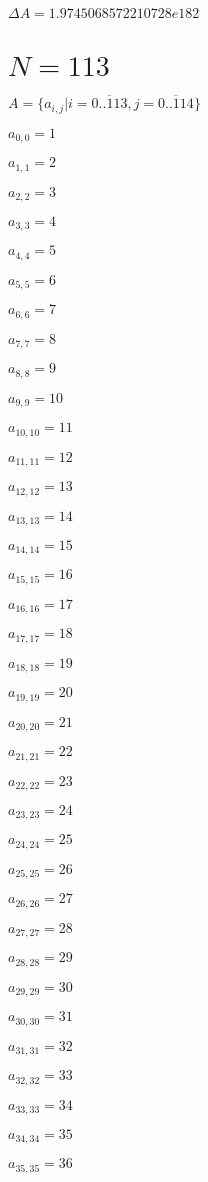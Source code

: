 \documentclass[a4paper,12pt]{article}
\begin{document}
$\Delta A = 1.9745068572210728e182$



\section{ $N = 113$ }
$A = \{ a _{ i, j } | i = \overline { 0..113 }, j = \overline { 0..114 } \}$

$a _{ 0, 0 } = 1$

$a _{ 1, 1 } = 2$

$a _{ 2, 2 } = 3$

$a _{ 3, 3 } = 4$

$a _{ 4, 4 } = 5$

$a _{ 5, 5 } = 6$

$a _{ 6, 6 } = 7$

$a _{ 7, 7 } = 8$

$a _{ 8, 8 } = 9$

$a _{ 9, 9 } = 10$

$a _{ 10, 10 } = 11$

$a _{ 11, 11 } = 12$

$a _{ 12, 12 } = 13$

$a _{ 13, 13 } = 14$

$a _{ 14, 14 } = 15$

$a _{ 15, 15 } = 16$

$a _{ 16, 16 } = 17$

$a _{ 17, 17 } = 18$

$a _{ 18, 18 } = 19$

$a _{ 19, 19 } = 20$

$a _{ 20, 20 } = 21$

$a _{ 21, 21 } = 22$

$a _{ 22, 22 } = 23$

$a _{ 23, 23 } = 24$

$a _{ 24, 24 } = 25$

$a _{ 25, 25 } = 26$

$a _{ 26, 26 } = 27$

$a _{ 27, 27 } = 28$

$a _{ 28, 28 } = 29$

$a _{ 29, 29 } = 30$

$a _{ 30, 30 } = 31$

$a _{ 31, 31 } = 32$

$a _{ 32, 32 } = 33$

$a _{ 33, 33 } = 34$

$a _{ 34, 34 } = 35$

$a _{ 35, 35 } = 36$
\end{document}
